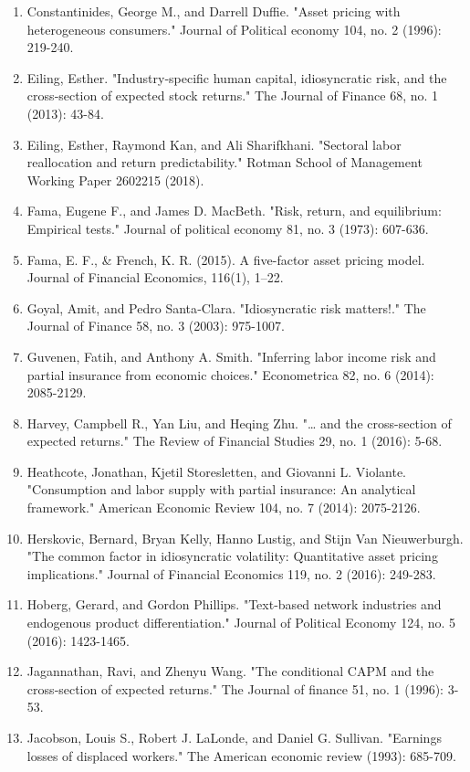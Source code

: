\documentclass[12pt]{article}
\begin{document}
\begin{enumerate}
    \item{Constantinides, George M., and Darrell Duffie. "Asset pricing with heterogeneous consumers." Journal of Political economy 104, no. 2 (1996): 219-240.}
    \item{Eiling, Esther. "Industry‐specific human capital, idiosyncratic risk, and the cross‐section of expected stock returns." The Journal of Finance 68, no. 1 (2013): 43-84.}
    \item{Eiling, Esther, Raymond Kan, and Ali Sharifkhani. "Sectoral labor reallocation and return predictability." Rotman School of Management Working Paper 2602215 (2018).}
    \item {Fama, Eugene F., and James D. MacBeth. "Risk, return, and equilibrium: Empirical tests." Journal of political economy 81, no. 3 (1973): 607-636.}
    \item {Fama, E. F., \& French, K. R. (2015). A five-factor asset pricing model. Journal of Financial Economics, 116(1), 1–22. }
    \item{Goyal, Amit, and Pedro Santa‐Clara. "Idiosyncratic risk matters!." The Journal of Finance 58, no. 3 (2003): 975-1007.}
    \item{Guvenen, Fatih, and Anthony A. Smith. "Inferring labor income risk and partial insurance from economic choices." Econometrica 82, no. 6 (2014): 2085-2129.}
    \item {Harvey, Campbell R., Yan Liu, and Heqing Zhu. "… and the cross-section of expected returns." The Review of Financial Studies 29, no. 1 (2016): 5-68.}
    \item{Heathcote, Jonathan, Kjetil Storesletten, and Giovanni L. Violante. "Consumption and labor supply with partial insurance: An analytical framework." American Economic Review 104, no. 7 (2014): 2075-2126.}
    \item{Herskovic, Bernard, Bryan Kelly, Hanno Lustig, and Stijn Van Nieuwerburgh. "The common factor in idiosyncratic volatility: Quantitative asset pricing implications." Journal of Financial Economics 119, no. 2 (2016): 249-283.}
    \item{Hoberg, Gerard, and Gordon Phillips. "Text-based network industries and endogenous product differentiation." Journal of Political Economy 124, no. 5 (2016): 1423-1465.}
    \item{Jagannathan, Ravi, and Zhenyu Wang. "The conditional CAPM and the cross‐section of expected returns." The Journal of finance 51, no. 1 (1996): 3-53.}
    \item{Jacobson, Louis S., Robert J. LaLonde, and Daniel G. Sullivan. "Earnings losses of displaced workers." The American economic review (1993): 685-709.}

\end{enumerate}
\end{document}
